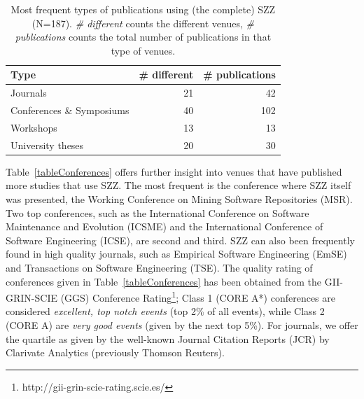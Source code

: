 \documentclass[a4paper, 12pt]{book}
\begin{document}
\begin{table}
\renewcommand{\arraystretch}{0.8}
\caption{ Most frequent types of publications using (the complete) SZZ (N=187). \emph{\# different} counts the different venues, \emph{\# publications} counts the total number of publications in that type of venues.}
\label{tableMedia}
\centering
\begin{adjustbox}{max width=\textwidth}
\begin{tabular}{|l|r|r|}
\hline
Type & \# different & \# publications  \\
\hline
\hline
 Journals & 21 & 42\\
\hline
 Conferences \& Symposiums & 40 & 102\\
\hline
Workshops & 13 & 13\\
\hline
University theses & 20 & 30 \\
\hline
\end{tabular}
\end{adjustbox}
\end{table}

Table~\ref{tableConferences} offers further insight into venues that have published more studies that use SZZ. The most frequent is the conference where SZZ itself was presented, the Working Conference on Mining Software Repositories (MSR). Two top conferences, such as the International Conference on Software Maintenance and Evolution (ICSME) and the International Conference of Software Engineering (ICSE), are second and third. SZZ can also been frequently found in high quality journals, such as Empirical Software Engineering (EmSE) and Transactions on Software Engineering (TSE).
The quality rating of conferences given in Table~\ref{tableConferences} has been obtained from the GII-GRIN-SCIE (GGS) Conference Rating\footnote{http://gii-grin-scie-rating.scie.es/}; Class 1 (CORE A*) conferences are considered \emph{excellent, top notch events} (top 2\% of all events), while Class 2 (CORE A) are \emph{very good events} (given by the next top 5\%). For journals, we offer the quartile as given by the well-known Journal Citation Reports (JCR) by Clarivate Analytics (previously Thomson Reuters).
\end{document}
